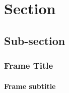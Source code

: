 \section{Section}	
\subsection{Sub-section}	
\begin{frame}
	\frametitle{Frame Title}
	\framesubtitle{Frame subtitle}

\end{frame}